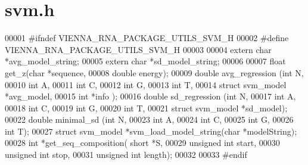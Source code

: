 \hypertarget{svm_8h_source}{}\section{svm.\+h}
\label{svm_8h_source}

\begin{DoxyCode}
00001 \textcolor{preprocessor}{#ifndef VIENNA\_RNA\_PACKAGE\_UTILS\_SVM\_H}
00002 \textcolor{preprocessor}{#define VIENNA\_RNA\_PACKAGE\_UTILS\_SVM\_H}
00003 
00004 \textcolor{keyword}{extern}  \textcolor{keywordtype}{char} *avg\_model\_string;
00005 \textcolor{keyword}{extern}  \textcolor{keywordtype}{char} *sd\_model\_string;
00006 
00007 \textcolor{keywordtype}{float}     get\_z(\textcolor{keywordtype}{char} *sequence,
00008                 \textcolor{keywordtype}{double} energy);
00009 \textcolor{keywordtype}{double}    avg\_regression (\textcolor{keywordtype}{int} N,
00010                           \textcolor{keywordtype}{int} A,
00011                           \textcolor{keywordtype}{int} C,
00012                           \textcolor{keywordtype}{int} G,
00013                           \textcolor{keywordtype}{int} T,
00014                           \textcolor{keyword}{struct} svm\_model *avg\_model,
00015                           \textcolor{keywordtype}{int} *info );
00016 \textcolor{keywordtype}{double}    sd\_regression  (\textcolor{keywordtype}{int} N,
00017                           \textcolor{keywordtype}{int} A,
00018                           \textcolor{keywordtype}{int} C,
00019                           \textcolor{keywordtype}{int} G,
00020                           \textcolor{keywordtype}{int} T,
00021                           \textcolor{keyword}{struct} svm\_model  *sd\_model);
00022 \textcolor{keywordtype}{double}    minimal\_sd     (\textcolor{keywordtype}{int} N,
00023                           \textcolor{keywordtype}{int} A,
00024                           \textcolor{keywordtype}{int} C,
00025                           \textcolor{keywordtype}{int} G,
00026                           \textcolor{keywordtype}{int} T);
00027 \textcolor{keyword}{struct }svm\_model *svm\_load\_model\_string(\textcolor{keywordtype}{char} *modelString);
00028 \textcolor{keywordtype}{int}       *get\_seq\_composition( \textcolor{keywordtype}{short} *S,
00029                                 \textcolor{keywordtype}{unsigned} \textcolor{keywordtype}{int} start,
00030                                 \textcolor{keywordtype}{unsigned} \textcolor{keywordtype}{int} stop,
00031                                 \textcolor{keywordtype}{unsigned} \textcolor{keywordtype}{int} length);
00032 
00033 \textcolor{preprocessor}{#endif}
\end{DoxyCode}

